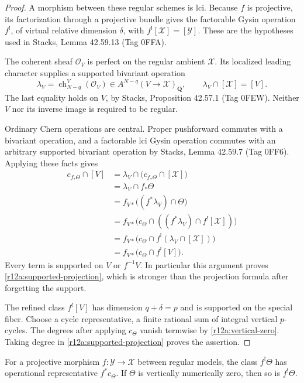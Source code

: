 \begin{proof}
A morphism between these regular schemes is lci.  Because $f$ is
projective, its factorization through a projective bundle gives the
factorable Gysin operation $f^!$, of virtual relative dimension
$\delta$, with $f^![\mathcal X]=[\mathcal Y]$.
These are the hypotheses used in Stacks, Lemma 42.59.13 (Tag 0FFA).

The coherent sheaf $\mathcal O_V$ is perfect on the regular ambient
$\mathcal X$.  Its localized leading character supplies a supported
bivariant operation
\[
 \lambda_V=
  \operatorname{ch}^{V}_{N-q}(\mathcal O_V)
          \in A^{N-q}(V\longrightarrow\mathcal X)_{\mathbf Q},
              \qquad \lambda_V\cap[\mathcal X]=[V].
\]
The last equality holds on $V$, by Stacks, Proposition 42.57.1
(Tag 0FEW).  Neither $V$ nor its inverse image is required to be regular.

Ordinary Chern operations are central.  Proper pushforward commutes
with a bivariant operation, and a factorable lci Gysin operation
commutes with an arbitrary supported bivariant operation by Stacks,
Lemma 42.59.7 (Tag 0FF6).  Applying these facts gives
\[
\begin{aligned}
 c_{f_*\Theta}\cap[V]
 &=\lambda_V\cap\bigl(c_{f_*\Theta}\cap[\mathcal X]\bigr)\\
 &=\lambda_V\cap f_*\Theta\\
 &=f_{V*}\bigl((f^*\lambda_V)\cap\Theta\bigr)\\
 &=f_{V*}\bigl(c_\Theta\cap
               ((f^*\lambda_V)\cap f^![\mathcal X])\bigr)\\
 &=f_{V*}\bigl(c_\Theta\cap
                          f^!(\lambda_V\cap[\mathcal X])\bigr)\\
 &=f_{V*}\bigl(c_\Theta\cap f^![V]\bigr).
\end{aligned}
\]
Every term is supported on $V$ or $f^{-1}V$.  In particular this
argument proves \eqref{r12a:supported-projection}, which is stronger
than the projection formula after forgetting the support.

The refined class $f^![V]$ has dimension $q+\delta=p$ and is supported
on the special fiber.  Choose a cycle representative, a finite rational
sum of integral vertical $p$-cycles.  The degrees after applying
$c_\Theta$ vanish termwise by \eqref{r12a:vertical-zero}.  Taking
degree in \eqref{r12a:supported-projection} proves the assertion.
\end{proof}

\begin{lemma}
\label{r12a:numerical-pullback}
For a projective morphism $f:\mathcal Y\to\mathcal X$ between regular
models, the class $f^!\Theta$ has operational representative
$f^*c_\Theta$.  If $\Theta$ is vertically numerically zero, then so
is $f^!\Theta$.
\end{lemma}

